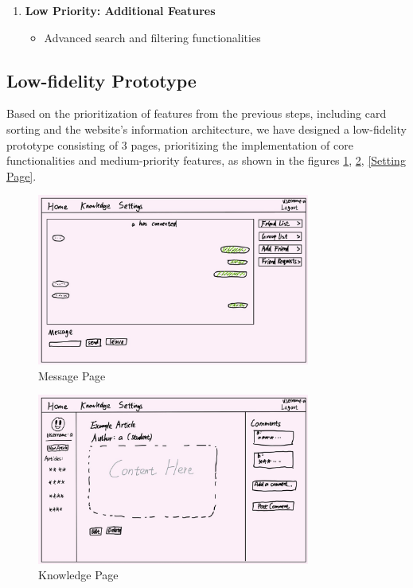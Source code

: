 \documentclass[12pt]{article}
\begin{document}
\begin{enumerate}
    \item \textbf{Low Priority: Additional Features}
        \begin{itemize}
            \item Advanced search and filtering functionalities
        \end{itemize}


    \end{enumerate}

\subsection{Low-fidelity Prototype}
    \hspace{2em}Based on the prioritization of features from the previous steps, including card sorting and the website's information architecture, we have designed a low-fidelity prototype consisting of 3 pages, prioritizing the implementation of core functionalities and medium-priority features, as shown in the figures \ref{Message Page}, \ref{Knowledge Page}, \ref{Setting Page}.
            
    \begin{figure}[H]
        \centering
        \includegraphics[width=0.8\textwidth]{graphs/message_page.jpg}
        \caption{Message Page}
        \label{Message Page}
    \end{figure}

    \begin{figure}[H]
        \centering
        \includegraphics[width=0.8\textwidth]{graphs/knowledge_page.jpg}
        \caption{Knowledge Page}
        \label{Knowledge Page}
    \end{figure}
\end{document}
